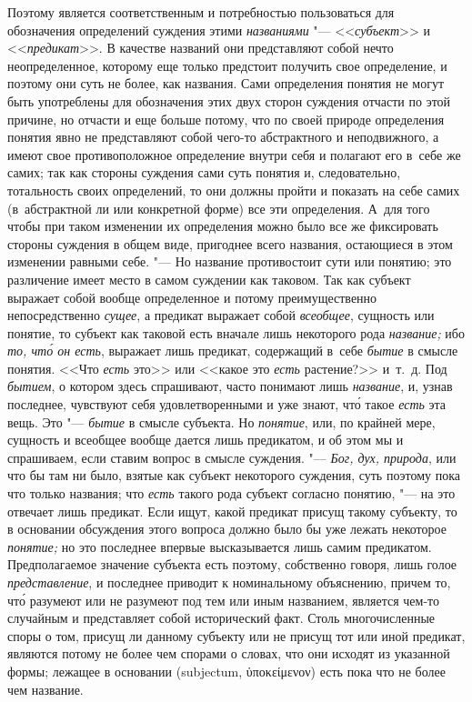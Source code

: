 Поэтому является соответственным и потребностью пользоваться
для обозначения определений суждения этими
{\em названиями} "--- <<{\em субъект}>> и <<{\em предикат}>>.
В качестве названий они представляют собой нечто
неопределенное, которому еще только предстоит получить свое определение, и
поэтому они суть не более, как названия. Сами определения понятия не могут
быть употреблены для обозначения этих двух сторон суждения отчасти по этой
причине, но отчасти и еще больше потому, что по своей природе определения
понятия явно не представляют собой чего-то абстрактного и неподвижного, а
имеют свое противоположное определение внутри себя и полагают его в~себе же
самих; так как стороны суждения сами суть понятия и,
следовательно, тотальность своих определений, то они должны пройти и
показать на себе самих (в~абстрактной ли или конкретной форме) все эти
определения. А~для того чтобы при таком изменении их определения можно было
все же фиксировать стороны суждения в общем виде, пригоднее всего названия,
остающиеся в этом изменении равными себе. "--- Но название
противостоит сути или понятию; это различение имеет место в самом суждении
как таковом. Так как субъект выражает собой вообще определенное и потому
преимущественно непосредственно {\em сущее}, а предикат
выражает собой {\em всеобщее},
сущность или понятие, то субъект как таковой есть вначале
лишь некоторого рода {\em название;} ибо {\em то, чт\'{о} он есть},
выражает лишь предикат, содержащий в~себе {\em бытие} в смысле
понятия. <<Что {\em есть} это>> или <<какое это {\em есть} растение?>>
и~т.~д. Под {\em бытием},
о котором здесь спрашивают, часто понимают лишь {\em название}, и, узнав
последнее, чувствуют себя удовлетворенными и уже знают, чт\'{о} такое
{\em есть} эта вещь. Это "--- {\em бытие} в смысле субъекта. Но
{\em понятие},
или, по крайней мере, сущность и всеобщее вообще дается лишь
предикатом, и об этом мы и спрашиваем, если ставим вопрос в смысле
суждения. "--- {\em Бог, дух, природа}, или что бы
там ни было, взятые как субъект некоторого суждения, суть поэтому пока что
только названия; что {\em есть} такого рода субъект согласно понятию, "--- на
это отвечает лишь предикат. Если ищут, какой предикат присущ такому субъекту,
то в основании обсуждения этого вопроса должно было бы уже лежать некоторое
{\em понятие;} но это последнее впервые высказывается лишь
самим предикатом. Предполагаемое значение субъекта есть
поэтому, собственно говоря, лишь голое {\em представление},
и последнее приводит к номинальному объяснению, причем то, чт\'{о} разумеют
или не разумеют под тем или иным названием, является чем-то случайным и
представляет собой исторический факт. Столь многочисленные споры о том,
присущ ли данному субъекту или не присущ тот или иной предикат, являются
потому не более чем спорами о словах, что они исходят из указанной формы;
лежащее в основании (subjectum, \textgreek{ὑποκείμενον}) есть пока
что не более чем название.

